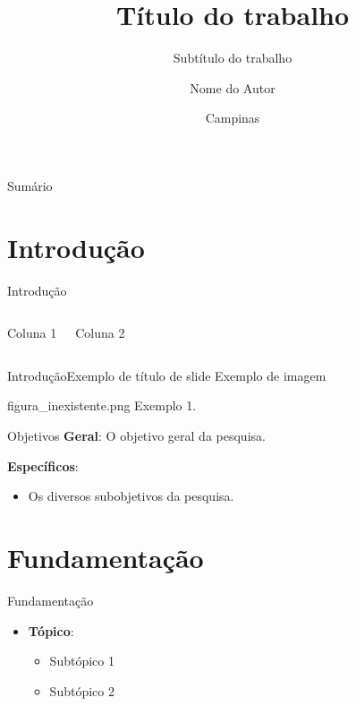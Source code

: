 \documentclass[
11pt,notheorems,hyperref={pdfauthor=Autor}
]{beamer}
\title{Título do trabalho}
\subtitle{Subtítulo do trabalho}
\author{Nome do Autor}
\institute{UNIVERSIDADE ESTADUAL DE CAMPINAS}
\date{Campinas \the\year}
\begin{document}
\begin{frame}[plain]
    \maketitle
\end{frame}

\begin{frame}[plain]{Sumário}
    \tableofcontents
\end{frame}

\section{Introdução}
\begin{frame}{Introdução}

\begin{columns}[T,onlytextwidth]
    Coluna 1 

    \pause
    Coluna 2
\end{columns}
\end{frame}

\begin{frame}{Introdução}{Exemplo de título de slide}
    Exemplo de imagem

    \centering
    \begin{minipage}{0.8\textwidth}
        \FigureWithFallbackCaption
        {figura_inexistente.png}
        {Exemplo 1.}
    \end{minipage}
\end{frame}

\begin{frame}{Objetivos}
    \pause
    \textbf{Geral}: O objetivo geral da pesquisa.

    \pause
    \textbf{Específicos}:
\begin{itemize}
    \item Os diversos subobjetivos da pesquisa.
\end{itemize}
\end{frame}

\section{Fundamentação}
\begin{frame}{Fundamentação}
\pause
    \begin{itemize}
        \item \textbf{Tópico}: \pause
            \begin{itemize}
                \item Subtópico 1 \pause
                \item Subtópico 2
            \end{itemize}     
    \end{itemize}
\end{frame}
\end{document}
